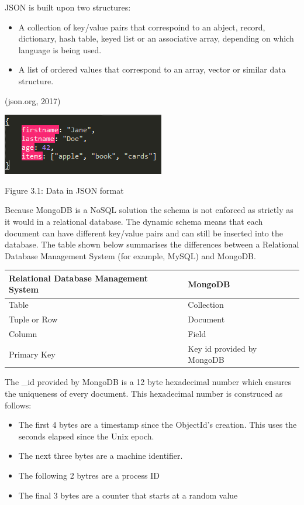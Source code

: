 \documentclass[12pt]{article}
\begin{document}
JSON is built upon two structures: 
\begin{itemize}
	\item A collection of key/value pairs that correspoind to an abject, record, dictionary, hash table, keyed list or an associative array, depending on which language is being used.
	\item A list of ordered values that correspond to an array, vector or similar data structure. 
\end{itemize}

(json.org, 2017)

\begin{center}
	\includegraphics[scale=1]{json_no_id.PNG}

	Figure 3.1: Data in JSON format
\end{center}

Because MongoDB is a NoSQL solution the schema is not enforced as strictly as it would in a relational database. The dynamic schema means that each document can have different key/value pairs and can still be inserted into the database. The table shown below summarises the differences between a Relational Database Management System (for example, MySQL) and MongoDB.

\begin{center}
    \begin{tabular}{| l | l |}
    \hline
    Relational Database Management System & MongoDB  \\ \hline
    Table & Collection \\ \hline
    Tuple or Row & Document \\ \hline
    Column & Field \\ \hline
    Primary Key & Key id provided by MongoDB \\ \hline
    \end{tabular}
\end{center}

The {\_}id provided by MongoDB is a 12 byte hexadecimal number which ensures the uniqueness of every document. This hexadecimal number is construced as follows:

\begin{itemize}
	\item The first 4 bytes are a timestamp since the ObjectId's creation. This uses the seconds elapsed since the Unix epoch.
	\item The next three bytes are a machine identifier.
	\item The following 2 bytres are a process ID
	\item The final 3 bytes are a counter that starts at a random value
\end{itemize}
\end{document}
